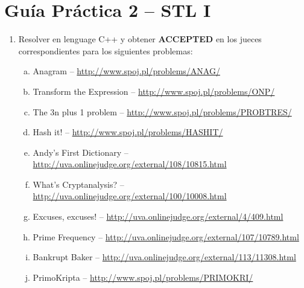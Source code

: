 




\section*{Gu\'ia Pr\'actica 2 -- STL I}

\begin{enumerate}[1 -]
	
	\item Resolver en lenguage C++ y obtener \textbf{ACCEPTED} en los jueces correspondientes para los siguientes problemas:
	
	\begin{enumerate}[a)]
		\item Anagram -- \href{http://www.spoj.pl/problems/ANAG/}{http://www.spoj.pl/problems/ANAG/}
		\item Transform the Expression -- \href{http://www.spoj.pl/problems/ONP/}{http://www.spoj.pl/problems/ONP/}
        \item The 3n plus 1 problem -- \href{http://www.spoj.pl/problems/PROBTRES/}{http://www.spoj.pl/problems/PROBTRES/}
		\item Hash it! -- \href{http://www.spoj.pl/problems/HASHIT/}{http://www.spoj.pl/problems/HASHIT/}
		\item Andy’s First Dictionary -- \href{http://uva.onlinejudge.org/external/108/10815.html}{http://uva.onlinejudge.org/external/108/10815.html}
		\item What's Cryptanalysis? -- \href{http://uva.onlinejudge.org/external/100/10008.html}{http://uva.onlinejudge.org/external/100/10008.html}
		\item Excuses, excuses! -- \href{http://uva.onlinejudge.org/external/4/409.html}{http://uva.onlinejudge.org/external/4/409.html}
		\item Prime Frequency -- \href{http://uva.onlinejudge.org/external/107/10789.html}{http://uva.onlinejudge.org/external/107/10789.html}
		\item Bankrupt Baker -- \href{http://uva.onlinejudge.org/external/113/11308.html}{http://uva.onlinejudge.org/external/113/11308.html}
		\item PrimoKripta -- \href{http://www.spoj.pl/problems/PRIMOKRI/}{http://www.spoj.pl/problems/PRIMOKRI/}
	\end{enumerate}

\end{enumerate}






